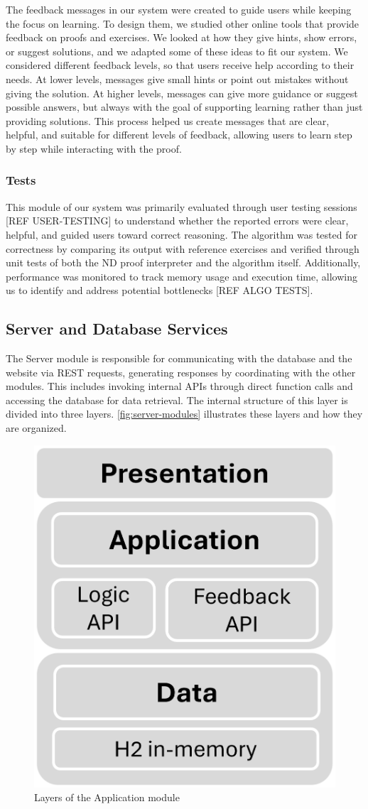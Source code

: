 The feedback messages in our system were created to guide users while keeping the focus on learning. To design them, we studied other online tools that provide feedback on proofs and exercises. We looked at how they give hints, show errors, or suggest solutions, and we adapted some of these ideas to fit our system. We considered different feedback levels, so that users receive help according to their needs. At lower levels, messages give small hints or point out mistakes without giving the solution. At higher levels, messages can give more guidance or suggest possible answers, but always with the goal of supporting learning rather than just providing solutions. This process helped us create messages that are clear, helpful, and suitable for different levels of feedback, allowing users to learn step by step while interacting with the proof.

\subsubsection{Tests}
This module of our system was primarily evaluated through user testing sessions [REF USER-TESTING] to understand whether the reported errors were clear, helpful, and guided users toward correct reasoning. The algorithm was tested for correctness by comparing its output with reference exercises and verified through unit tests of both the ND proof interpreter and the algorithm itself. Additionally, performance was monitored to track memory usage and execution time, allowing us to identify and address potential bottlenecks [REF ALGO TESTS].

\subsection{Server and Database Services}
The Server module is responsible for communicating with the database and the website via REST requests, generating responses by coordinating with the other modules. This includes invoking internal APIs through direct function calls and accessing the database for data retrieval. The internal structure of this layer is divided into three layers. \autoref{fig:server-modules} illustrates these layers and how they are organized.

\begin{figure}
    \centering
    \includegraphics[width=0.35\linewidth]{Chapters/Figures/server-modules.png}
   \caption{Layers of the Application module}
    \label{fig:server-modules}
\end{figure}

